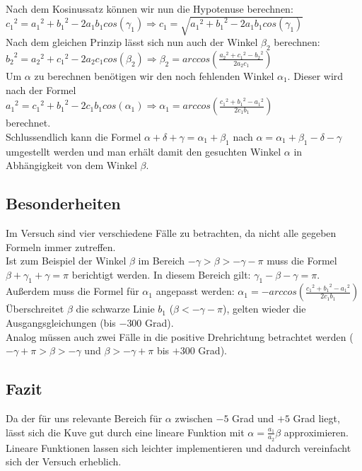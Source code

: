 Nach dem Kosinussatz können wir nun die Hypotenuse berechnen:\\ ${c_1}^2 = {a_1}^2 + {b_1}^2 -2a_1b_1cos(\gamma_1) \Rightarrow c_1 = \sqrt{{a_1}^2 + {b_1}^2 -2a_1b_1cos(\gamma_1)}$ \\
Nach dem gleichen Prinzip lässt sich nun auch der Winkel $\beta_2$ berechnen:\\
${b_2}^2 = {a_2}^2 + {c_1}^2 - 2a_2 c_1 cos(\beta_2) \Rightarrow \beta_2 = arccos(\frac{{a_2}^2 + {c_1}^2 - {b_2}^2}{2a_2 c_1})$\\
Um $\alpha$ zu berechnen benötigen wir den noch fehlenden Winkel $\alpha_1$. Dieser wird nach der Formel \\
${a_1}^2 = {c_1}^2 + {b_1}^2 - 2c_1 b_1 cos(\alpha_1) \Rightarrow \alpha_1 = arccos(\frac{{c_1}^2+{b_1}^2-{a_1}^2}{2c_1 b_1})$ \\
berechnet.\\
Schlussendlich kann die Formel $\alpha + \delta + \gamma = \alpha_1 + \beta_1$ nach $\alpha = \alpha_1 +\beta_1 - \delta - \gamma$ umgestellt werden und man erhält damit den gesuchten Winkel $\alpha$ in Abhängigkeit von dem Winkel $\beta$.

\subsection{Besonderheiten}
Im Versuch sind vier verschiedene Fälle zu betrachten, da nicht alle gegeben Formeln immer zutreffen.\\ Ist zum Beispiel der Winkel $\beta$ im Bereich $-\gamma > \beta > -\gamma -\pi$ muss die Formel $\beta + \gamma_1 + \gamma = \pi$ berichtigt werden. In diesem Bereich gilt: $\gamma_1 - \beta - \gamma = \pi$. Außerdem muss die Formel für $\alpha_1$ angepasst werden: $\alpha_1 = -arccos(\frac{{c_1}^2+{b_1}^2-{a_1}^2}{2c_1 b_1})$ \\
Überschreitet $\beta$ die schwarze Linie $b_1$ ($\beta < -\gamma - \pi$), gelten wieder die Ausgangsgleichungen (bis $-300$ Grad). \\
Analog müssen auch zwei Fälle in die positive Drehrichtung betrachtet werden ($-\gamma + \pi > \beta > -\gamma$ und $\beta > -\gamma + \pi$ bis $+300$ Grad).

\subsection{Fazit}
Da der für uns relevante Bereich für $\alpha$ zwischen $-5$ Grad und $+5$ Grad liegt, lässt sich die Kuve gut durch eine lineare Funktion mit $\alpha = \frac{a_1}{a_2}\beta$ approximieren. Lineare Funktionen lassen sich leichter implementieren und dadurch vereinfacht sich der Versuch erheblich.

 
